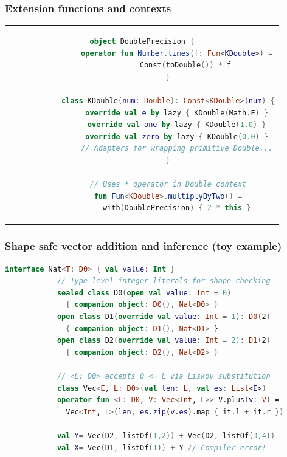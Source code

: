 \documentclass{beamer}
\begin{document}
    \begin{frame}[fragile]
        \frametitle{Extension functions and contexts}
\begin{center}
\begin{tabular}{c}
        \begin{lstlisting}[language=Kotlin, gobble=12]
            object DoublePrecision {
                operator fun Number.times(f: Fun<KDouble>) =
                    Const(toDouble()) * f
            }

            class KDouble(num: Double): Const<KDouble>(num) {
                override val e by lazy { KDouble(Math.E) }
                override val one by lazy { KDouble(1.0) }
                override val zero by lazy { KDouble(0.0) }
                // Adapters for wrapping primitive Double...
            }

            // Uses * operator in Double context
            fun Fun<KDouble>.multiplyByTwo() =
                with(DoublePrecision) { 2 * this }
        \end{lstlisting}
\end{tabular}
\end{center}
    \end{frame}


    \begin{frame}[fragile]
        \frametitle{Shape safe vector addition and inference (toy example)}
        \begin{lstlisting}[language=Kotlin, gobble=12, style=backtickstyle]
            interface Nat<T: D0> { val value: Int }
            // Type level integer literals for shape checking
            sealed class D0(open val value: Int = 0)
              { companion object: D0(), Nat<D0> }
            open class D1(override val value: Int = 1): D0(2)
              { companion object: D1(), Nat<D1> }
            open class D2(override val value: Int = 2): D1(2)
              { companion object: D2(), Nat<D2> }

            // <L: D0> accepts 0 <= L via Liskov substitution
            class Vec<E, L: D0>(val len: L, val es: List<E>)
            operator fun <L: D0, V: Vec<Int, L>> V.plus(v: V) =
              Vec<Int, L>(len, es.zip(v.es).map { it.l + it.r })

            val Y= Vec(D2, listOf(1,2)) + Vec(D2, listOf(3,4))
            val X= Vec(D1, listOf(1)) + Y // Compiler error!
        \end{lstlisting}
    \end{frame}
\end{document}
